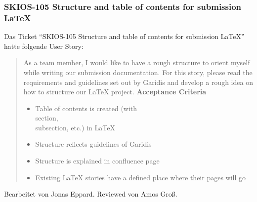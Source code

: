 \subsubsection{SKIOS-105 Structure and table of contents for submission LaTeX}
Das Ticket \enquote{SKIOS-105 Structure and table of contents for submission LaTeX} hatte folgende User Story:
\begin{quotation}
    As a team member, I would like to have a rough structure to orient myself while writing our submission documentation.
    For this story, please read the requirements and guidelines set out by Garidis and develop a rough idea on how to structure our LaTeX project.
\textbf{Acceptance Criteria}
\begin{itemize}
    \item Table of contents is created (with \\section, \\subsection, etc.) in LaTeX
    \item Structure reflects guidelines of Garidis
    \item Structure is explained in confluence page
    \item Existing LaTeX stories have a defined place where their pages will go
\end{itemize}
\end{quotation}
Bearbeitet von Jonas Eppard.
Reviewed von Amos Groß.

